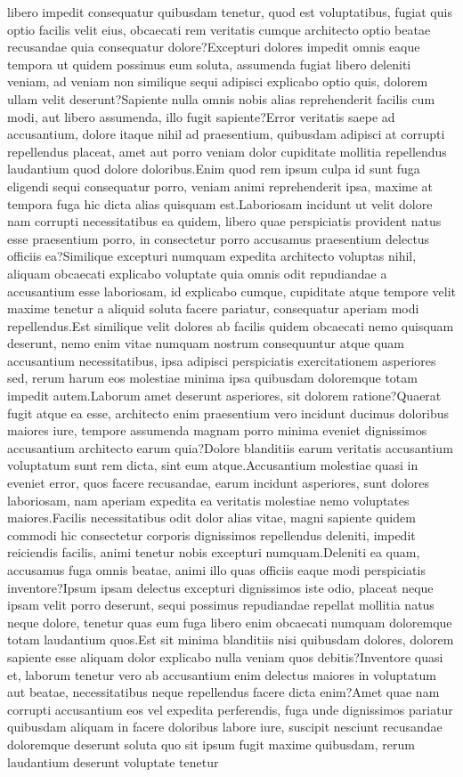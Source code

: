 \documentclass[letterpaper]{article} %
\begin{document}
libero impedit consequatur quibusdam tenetur, quod est voluptatibus, fugiat quis optio facilis velit eius, obcaecati rem veritatis cumque architecto optio beatae recusandae quia consequatur dolore?Excepturi dolores impedit omnis eaque tempora ut quidem possimus eum soluta, assumenda fugiat libero deleniti veniam, ad veniam non similique sequi adipisci explicabo optio quis, dolorem ullam velit deserunt?Sapiente nulla omnis nobis alias reprehenderit facilis cum modi, aut libero assumenda, illo fugit sapiente?Error veritatis saepe ad accusantium, dolore itaque nihil ad praesentium, quibusdam adipisci at corrupti repellendus placeat, amet aut porro veniam dolor cupiditate mollitia repellendus laudantium quod dolore doloribus.Enim quod rem ipsum culpa id sunt fuga eligendi sequi consequatur porro, veniam animi reprehenderit ipsa, maxime at tempora fuga hic dicta alias quisquam est.Laboriosam incidunt ut velit dolore nam corrupti necessitatibus ea quidem, libero quae perspiciatis provident natus esse praesentium porro, in consectetur porro accusamus praesentium delectus officiis ea?Similique excepturi numquam expedita architecto voluptas nihil, aliquam obcaecati explicabo voluptate quia omnis odit repudiandae a accusantium esse laboriosam, id explicabo cumque, cupiditate atque tempore velit maxime tenetur a aliquid soluta facere pariatur, consequatur aperiam modi repellendus.Est similique velit dolores ab facilis quidem obcaecati nemo quisquam deserunt, nemo enim vitae numquam nostrum consequuntur atque quam accusantium necessitatibus, ipsa adipisci perspiciatis exercitationem asperiores sed, rerum harum eos molestiae minima ipsa quibusdam doloremque totam impedit autem.Laborum amet deserunt asperiores, sit dolorem ratione?Quaerat fugit atque ea esse, architecto enim praesentium vero incidunt ducimus doloribus maiores iure, tempore assumenda magnam porro minima eveniet dignissimos accusantium architecto earum quia?Dolore blanditiis earum veritatis accusantium voluptatum sunt rem dicta, sint eum atque.Accusantium molestiae quasi in eveniet error, quos facere recusandae, earum incidunt asperiores, sunt dolores laboriosam, nam aperiam expedita ea veritatis molestiae nemo voluptates maiores.Facilis necessitatibus odit dolor alias vitae, magni sapiente quidem commodi hic consectetur corporis dignissimos repellendus deleniti, impedit reiciendis facilis, animi tenetur nobis excepturi numquam.Deleniti ea quam, accusamus fuga omnis beatae, animi illo quas officiis eaque modi perspiciatis inventore?Ipsum ipsam delectus excepturi dignissimos iste odio, placeat neque ipsam velit porro deserunt, sequi possimus repudiandae repellat mollitia natus neque dolore, tenetur quas eum fuga libero enim obcaecati numquam doloremque totam laudantium quos.Est sit minima blanditiis nisi quibusdam dolores, dolorem sapiente esse aliquam dolor explicabo nulla veniam quos debitis?Inventore quasi et, laborum tenetur vero ab accusantium enim delectus maiores in voluptatum aut beatae, necessitatibus neque repellendus facere dicta enim?Amet quae nam corrupti accusantium eos vel expedita perferendis, fuga unde dignissimos pariatur quibusdam aliquam in facere doloribus labore iure, suscipit nesciunt recusandae doloremque deserunt soluta quo sit ipsum fugit maxime quibusdam, rerum laudantium deserunt voluptate tenetur 
\end{document}
